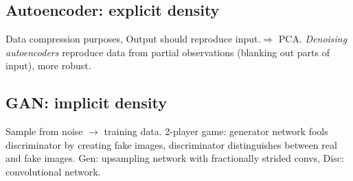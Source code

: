 \subsection*{Autoencoder: explicit density}
Data compression purposes, Output should reproduce input.$\Rightarrow$ PCA. \textit{Denoising autoencoders} reproduce data from partial observations (blanking out parts of input), more robust.

\subsection*{GAN: implicit density}
Sample from noise $\to$ training data. 2-player game: generator network fools discriminator by creating fake images, discriminator distinguishes between real and fake images. Gen: upsampling network with fractionally strided convs, Disc: convolutional network.




